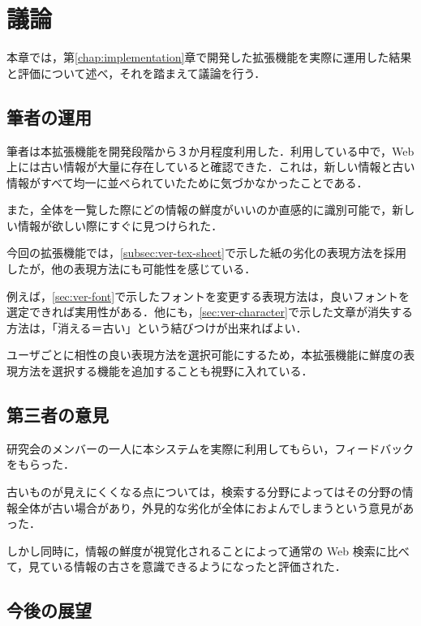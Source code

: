 \chapter{議論}
\label{chap:discussion}

本章では，第\ref{chap:implementation}章で開発した拡張機能を実際に運用した結果と評価について述べ，それを踏まえて議論を行う．

\newpage

\section{筆者の運用}

筆者は本拡張機能を開発段階から３か月程度利用した．利用している中で，Web 上には古い情報が大量に存在していると確認できた．これは，新しい情報と古い情報がすべて均一に並べられていたために気づかなかったことである．

また，全体を一覧した際にどの情報の鮮度がいいのか直感的に識別可能で，新しい情報が欲しい際にすぐに見つけられた．

今回の拡張機能では，\ref{subsec:ver-tex-sheet}で示した紙の劣化の表現方法を採用したが，他の表現方法にも可能性を感じている．

例えば，\ref{sec:ver-font}で示したフォントを変更する表現方法は，良いフォントを選定できれば実用性がある．他にも，\ref{sec:ver-character}で示した文章が消失する方法は，「消える＝古い」という結びつけが出来ればよい．

ユーザごとに相性の良い表現方法を選択可能にするため，本拡張機能に鮮度の表現方法を選択する機能を追加することも視野に入れている．

\section{第三者の意見}
\label{sec:dis_third}

研究会のメンバーの一人に本システムを実際に利用してもらい，フィードバックをもらった．

古いものが見えにくくなる点については，検索する分野によってはその分野の情報全体が古い場合があり，外見的な劣化が全体におよんでしまうという意見があった．

しかし同時に，情報の鮮度が視覚化されることによって通常の Web 検索に比べて，見ている情報の古さを意識できるようになったと評価された．

\section{今後の展望}

